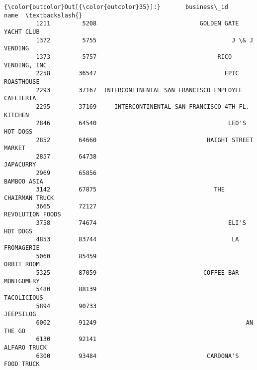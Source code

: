 \documentclass[11pt]{article}
\begin{document}
\begin{Verbatim}[commandchars=\\\{\}]
{\color{outcolor}Out[{\color{outcolor}35}]:}       business\_id                                               name  \textbackslash{}
         1211         5208                             GOLDEN GATE YACHT CLUB   
         1372         5755                                      J \& J VENDING   
         1373         5757                                  RICO VENDING, INC   
         2258        36547                                    EPIC ROASTHOUSE   
         2293        37167  INTERCONTINENTAL SAN FRANCISCO EMPLOYEE CAFETERIA   
         2295        37169     INTERCONTINENTAL SAN FRANCISCO 4TH FL. KITCHEN   
         2846        64540                                     LEO'S HOT DOGS   
         2852        64660                               HAIGHT STREET MARKET   
         2857        64738                                          JAPACURRY   
         2969        65856                                        BAMBOO ASIA   
         3142        67875                                 THE CHAIRMAN TRUCK   
         3665        72127                                   REVOLUTION FOODS   
         3758        74674                                     ELI'S HOT DOGS   
         4853        83744                                      LA FROMAGERIE   
         5060        85459                                         ORBIT ROOM   
         5325        87059                              COFFEE BAR-MONTGOMERY   
         5480        88139                                        TACOLICIOUS   
         5894        90733                                          JEEPSILOG   
         6002        91249                                          AN THE GO   
         6130        92141                                       ALFARO TRUCK   
         6300        93484                               CARDONA'S FOOD TRUCK   
         

\end{Verbatim}
\end{document}
